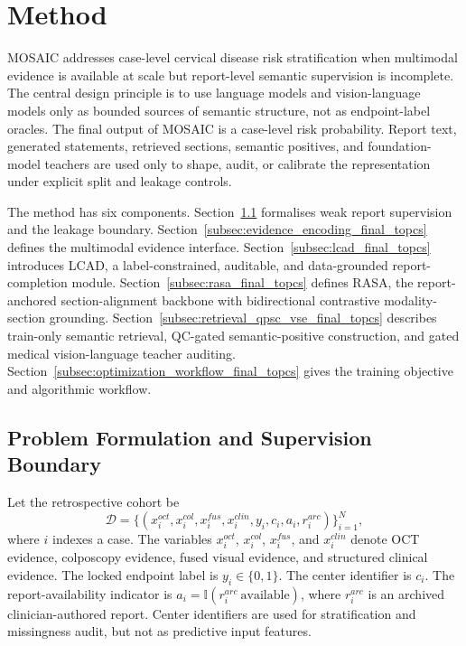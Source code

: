 \section{Method}
\label{sec:methods}

MOSAIC addresses case-level cervical disease risk stratification when multimodal evidence is available at scale but report-level semantic supervision is incomplete. The central design principle is to use language models and vision-language models only as bounded sources of semantic structure, not as endpoint-label oracles. The final output of MOSAIC is a case-level risk probability. Report text, generated statements, retrieved sections, semantic positives, and foundation-model teachers are used only to shape, audit, or calibrate the representation under explicit split and leakage controls.

The method has six components. Section~\ref{subsec:problem_overview_final_topcs} formalises weak report supervision and the leakage boundary. Section~\ref{subsec:evidence_encoding_final_topcs} defines the multimodal evidence interface. Section~\ref{subsec:lcad_final_topcs} introduces LCAD, a label-constrained, auditable, and data-grounded report-completion module. Section~\ref{subsec:rasa_final_topcs} defines RASA, the report-anchored section-alignment backbone with bidirectional contrastive modality-section grounding. Section~\ref{subsec:retrieval_qpsc_vse_final_topcs} describes train-only semantic retrieval, QC-gated semantic-positive construction, and gated medical vision-language teacher auditing. Section~\ref{subsec:optimization_workflow_final_topcs} gives the training objective and algorithmic workflow.

\subsection{Problem Formulation and Supervision Boundary}
\label{subsec:problem_overview_final_topcs}

Let the retrospective cohort be
\begin{equation}
\mathcal{D}=
\{(x_i^{oct},x_i^{col},x_i^{fus},x_i^{clin},y_i,c_i,a_i,r_i^{arc})\}_{i=1}^{N},
\label{eq:mosaic_dataset_final_topcs}
\end{equation}
where $i$ indexes a case. The variables $x_i^{oct}$, $x_i^{col}$, $x_i^{fus}$, and $x_i^{clin}$ denote OCT evidence, colposcopy evidence, fused visual evidence, and structured clinical evidence. The locked endpoint label is $y_i\in\{0,1\}$. The center identifier is $c_i$. The report-availability indicator is $a_i=\mathbb{I}(r_i^{arc}\ \mathrm{available})$, where $r_i^{arc}$ is an archived clinician-authored report. Center identifiers are used for stratification and missingness audit, but not as predictive input features.

